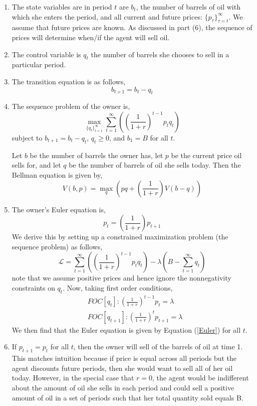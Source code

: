 \documentclass[letterpaper,12pt]{article}
\theoremstyle{definition}
\begin{document}
\begin{enumerate}
  \item The state variables are in period $t$ are $b_t$, the number of barrels of oil with which she enters the period, and all current and future prices: $\{p_{\tau} \}_{\tau = t}^{\infty}$. We assume that future prices are known. As discussed in part (6), the sequence of prices will determine when/if the agent will sell oil.
  \item The control variable is $q_t$ the number of barrels she chooses to sell in a particular period.
  \item The transition equation is as follows,
  \begin{equation}
    b_{t+1} = b_t - q_t
  \end{equation}
  \item The sequence problem of the owner is,
  \begin{equation}
    \max_{\{q_t\}_{t=1}^{\infty}} \sum_{t=1}^{\infty} \left( \left(\frac{1}{1+r}\right)^{t-1} p_t q_t \right)
  \end{equation}
  subject to $b_{t+1} = b_t - q_t$, $q_t \geq 0$, and $b_1 = B$ for all $t$.

  Let $b$ be the number of barrels the owner has, let $p$ be the current price oil sells for, and let $q$ be the number of barrels of oil she sells today. Then the Bellman equation is given by,
  \begin{equation}
    V(b, p) = \max_{q} \left(pq + \left(\frac{1}{1+r}\right)V(b - q) \right)
  \end{equation}
  \item The owner's Euler equation is,
  \begin{equation}\label{Euler}
    p_t = \left(\frac{1}{1+r}\right) p_{t+1}
  \end{equation}
  We derive this by setting up a constrained maximization problem (the sequence problem) as follows,
  \begin{equation}
    \mathcal{L} = \sum_{t=1}^{\infty} \left( \left(\frac{1}{1+r}\right)^{t-1} p_t q_t \right) - \lambda(B - \sum_{t=1}^{\infty} q_t)
  \end{equation}
  note that we assume positive prices and hence ignore the nonnegativity constraints on $q_t$. Now, taking first order conditions,
  \begin{align*}
    &FOC[q_t]: \left(\frac{1}{1+r}\right)^{t-1}p_t = \lambda \\
    &FOC[q_{t+1}]: \left(\frac{1}{1+r}\right)^{t}p_{t+1} = \lambda
  \end{align*}
  We then find that the Euler equation is given by Equation (\ref{Euler}) for all $t$.
  \item If $p_{t+1} = p_t$ for all $t$, then the owner will sell of the barrels of oil at time 1. This matches intuition because if price is equal across all periods but the agent discounts future periods, then she would want to sell all of her oil today. However, in the special case that $r=0$, the agent would be indifferent about the amount of oil she sells in each period and could sell a positive amount of oil in a set of periods such that her total quantity sold equals B.


\end{enumerate}
\end{document}

